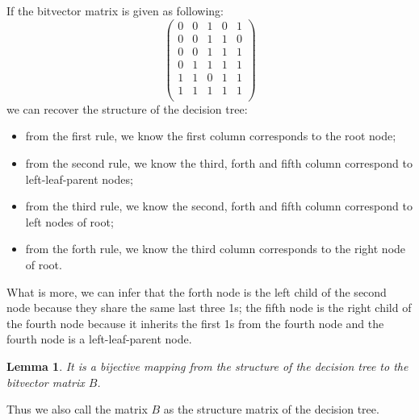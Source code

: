 \documentclass[UTF8]{article}
\newtheorem{lemma}{Lemma}
\begin{document}
If the bitvector matrix is given as following:
$$
\begin{pmatrix}
0 & 0 & 1 & 0 & 1\\
0 & 0 & 1 & 1 & 0\\
0 & 0 & 1 & 1 & 1\\
0 & 1 & 1 & 1 & 1\\
1 & 1 & 0 & 1 & 1\\
1 & 1 & 1 & 1 & 1\\
\end{pmatrix}
$$
we can recover the structure of the decision tree:
\begin{itemize}
\item from the first rule, we know the first column corresponds to the root node;
\item from the second rule, we know the third, forth and fifth column correspond to left-leaf-parent nodes;
\item from the third rule, we know the second, forth and fifth column correspond to left nodes of root;
\item from the forth rule, we know the third column corresponds to the right node of root.
\end{itemize}
What is more, we can infer that the forth node is the left child of the second node
because they share the same last three 1s;
the fifth node is the right child of the fourth node
because it inherits the first 1s from the fourth node and  the fourth node is a left-leaf-parent node.
\begin{lemma}
It is a bijective mapping from the  structure of the decision tree to the bitvector matrix $B$.
\end{lemma}

Thus we also call the matrix $B$ as the structure matrix of the decision tree.

\end{document}
